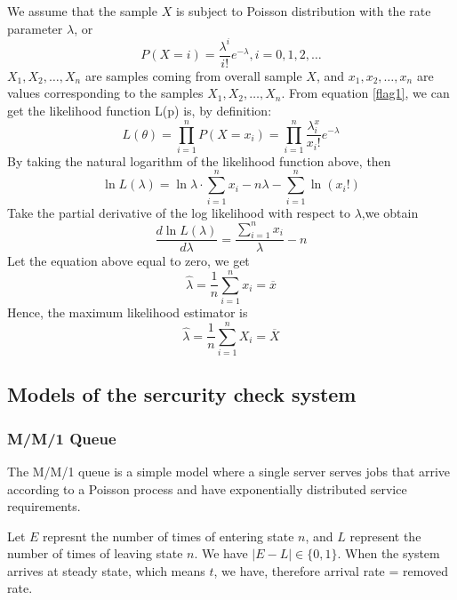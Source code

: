 \documentclass{mcmthesis}
\begin{document}
		We assume that the sample ${X}$ is subject to Poisson distribution with the rate parameter ${\lambda}$, or
			\begin{equation}
				P(X = i) = \frac {\lambda ^ i}{i!}e^{-\lambda},i=0,1,2,\dots
			\end{equation}
		${X_1,X_2, \dots ,X_n}$ are samples coming from overall sample ${X}$, and ${x_1,x_2, \dots ,x_n}$ are values corresponding to the samples  ${X_1,X_2, \dots ,X_n}$. 
		From equation \eqref{flag1}, we can get the likelihood function L(p) is, by definition:
			\begin{equation}
				L(\theta) = \prod_{i=1}^{n}P(X=x_i) = \prod_{i=1}^{n} {\frac{{\lambda}^x_i}{x_i!}}e^{-\lambda}
			\end{equation}
		By taking  the natural logarithm of the likelihood function above, then
			$${\ln L(\lambda) = \ln {\lambda} \cdot \sum_{i=1}^{n}x_i-n\lambda- \sum_{i=1}^{n}\ln (x_i!)}$$
		Take the partial derivative of the log likelihood with respect to ${\lambda}$,we obtain
			$${\frac {d \ln L(\lambda)}{d \lambda} = \frac {\sum\limits_{i=1}^{n}x_i}{\lambda} -n}$$
		Let the equation above equal to zero, we get
			\begin{equation}
				\hat \lambda = \frac{1}{n} \sum_{i=1}^{n}x_i = \overline x
 			\end{equation}
		Hence, the  maximum likelihood estimator is
			\begin{equation}
				\hat \lambda = \frac{1}{n} \sum_{i=1}^{n}X_i = \overline X
			\end{equation}
	\subsection{Models of the sercurity check system}%
		\subsubsection{M/M/1 Queue}
			The M/M/1 queue is a simple model where a single server serves jobs that arrive according to a Poisson process and have exponentially distributed service requirements. 
			
			Let ${E}$ represnt the number of times of entering state ${n}$, and ${L}$ represent the number of times of leaving state ${n}$. We have ${|E - L| \in \{0,1\}}$. When the system arrives at steady state, which means ${t}$, we have, therefore arrival rate = removed rate.
			
\end{document}
